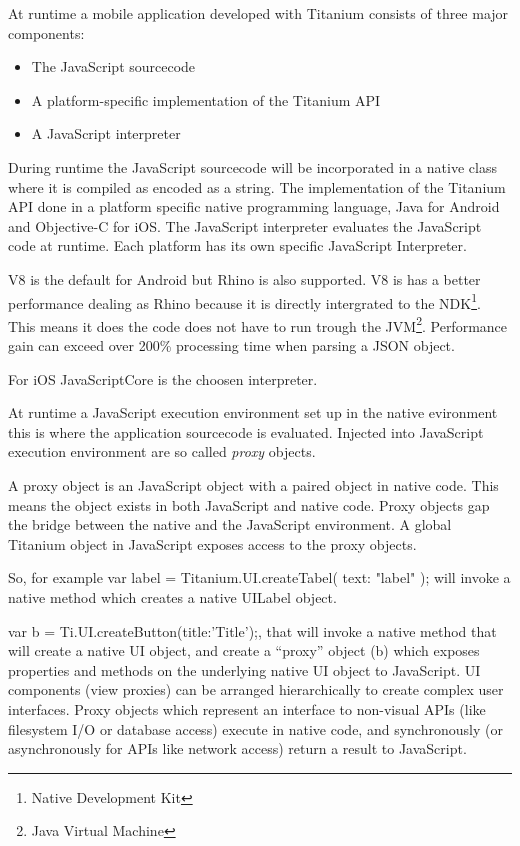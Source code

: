 
At runtime a mobile application developed with Titanium consists of three major components:
\begin{itemize}
	\item
	The JavaScript sourcecode
	\item
	A platform-specific implementation of the Titanium API
	\item
	A JavaScript interpreter
\end{itemize}

During runtime the JavaScript sourcecode will be incorporated in a native class where it is compiled as encoded as a string. The implementation of the Titanium API done in a platform specific native programming language, Java for Android and Objective-C for iOS. The JavaScript interpreter evaluates the JavaScript code at runtime. Each platform has its own specific JavaScript Interpreter.

V8 is the default for Android but Rhino is also supported. V8 is has a better performance dealing as Rhino because it is directly intergrated to the NDK\footnote{Native Development Kit}. This means it does the code does not have to run trough the JVM\footnote{Java Virtual Machine}. Performance gain can exceed over 200\% processing time when parsing a JSON object.\cite{Lukasavage2011}

For iOS JavaScriptCore is the choosen interpreter.

At runtime a JavaScript execution environment set up in the native evironment this is where the application sourcecode is evaluated. Injected into JavaScript execution environment are so called \emph{proxy} objects.

A proxy object is an JavaScript object with a paired object in native code.\cite{Whinnery2012} This means the object exists in both JavaScript and native code. Proxy objects gap the bridge between the native and the JavaScript environment. A global Titanium object in JavaScript exposes access to the proxy objects. 

So, for example var label = Titanium.UI.createTabel({ text: "label" }); will invoke a native method which creates a native UILabel object. 

var b = Ti.UI.createButton({title:'Title'});, that will invoke a native method that will create a native UI object, and create a “proxy” object (b) which exposes properties and methods on the underlying native UI object to JavaScript.
UI components (view proxies) can be arranged hierarchically to create complex user interfaces. Proxy objects which represent an interface to non-visual APIs (like filesystem I/O or database access) execute in native code, and synchronously (or asynchronously for APIs like network access) return a result to JavaScript. 


